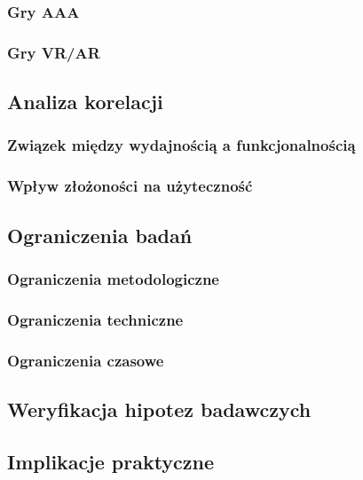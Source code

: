 \subsubsection{Gry AAA}

\subsubsection{Gry VR/AR}

\subsection{Analiza korelacji}
\subsubsection{Związek między wydajnością a funkcjonalnością}

\subsubsection{Wpływ złożoności na użyteczność}

\subsection{Ograniczenia badań}
\subsubsection{Ograniczenia metodologiczne}

\subsubsection{Ograniczenia techniczne}

\subsubsection{Ograniczenia czasowe}

\subsection{Weryfikacja hipotez badawczych}

\subsection{Implikacje praktyczne}
